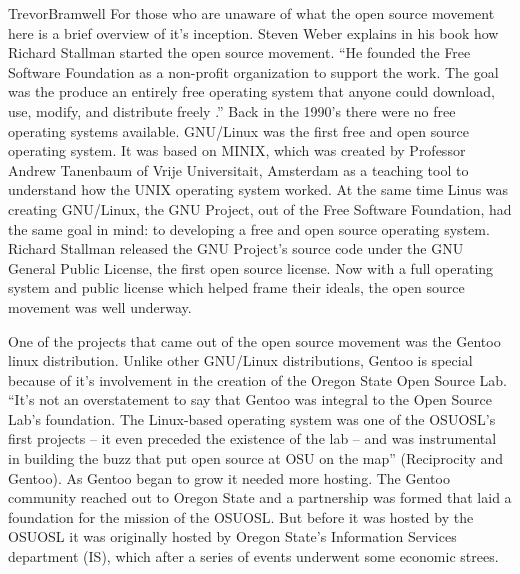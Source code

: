 \documentclass[12pt,letterpaper]{article}
\begin{document}
\begin{mla}{Trevor}{Bramwell}
For those who are unaware of what the open source movement here is a brief
overview of it's inception.
Steven Weber explains in his book how Richard Stallman started the open source
movement. ``He founded the Free Software Foundation as a non-profit 
organization to support the work. The goal was the produce an entirely free
operating system that anyone could download, use, modify, and distribute freely
.''
Back in the 1990's there were no free operating systems available.
GNU/Linux 
was the first free and open source operating system. It was based 
on MINIX, which was created by Professor Andrew Tanenbaum of Vrije 
Universitait, Amsterdam as a teaching tool to understand how the UNIX 
operating system worked. At the same time Linus was creating GNU/Linux, the GNU
Project, out of the Free Software Foundation, had the same goal in mind: to 
developing a free and open source 
operating system. Richard Stallman released the
GNU Project's source code under the GNU General Public License, the first open 
source license. Now with a full operating system and public license which
helped frame their ideals, the open source movement was well underway. 

One of the projects that came out of the open source movement was the Gentoo 
linux distribution.
Unlike other GNU/Linux distributions, Gentoo is special because of it's
involvement in the creation of the Oregon State Open Source Lab.
``It's not an overstatement to say that Gentoo was integral to the Open Source
Lab’s foundation. The Linux-based operating system was one of the OSUOSL's 
first
projects – it even preceded the existence of the lab – and was instrumental in
building the buzz that put open source at OSU on the map'' (Reciprocity and
Gentoo). As Gentoo began to grow it needed more hosting. The Gentoo community
reached out to Oregon State and a partnership was formed that laid a
foundation for the mission of the OSUOSL. But before it was hosted by the
OSUOSL it was originally hosted by Oregon State's Information Services 
department (IS), which after a series of events underwent some 
economic strees.


\end{mla}
\end{document}
